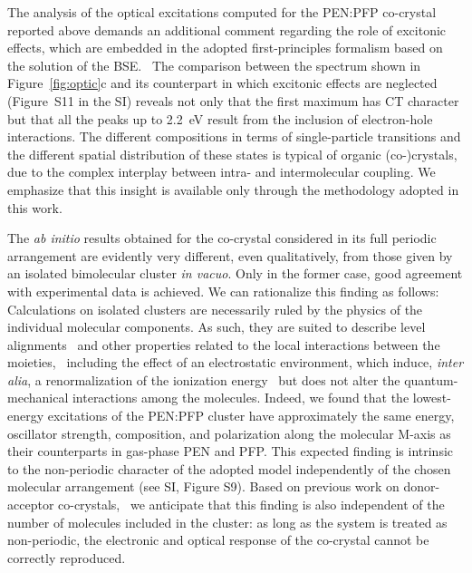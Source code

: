 \documentclass[journal=jpclcd,manuscript=letter]{achemso}
\begin{document}
The analysis of the optical excitations computed for the PEN:PFP co-crystal reported above demands an additional comment regarding the role of excitonic effects, which are embedded in the adopted first-principles formalism based on the solution of the BSE.~\cite{vorw+19es}
The comparison between the spectrum shown in Figure~\ref{fig:optic}c and its counterpart in which excitonic effects are neglected (Figure~S11 in the SI) reveals not only that the first maximum has CT character but that all the %
peaks up to 2.2~eV result from the inclusion of %
electron-hole interactions.
The different compositions in terms of single-particle transitions and the different spatial distribution of these %
states is typical of organic (co-)crystals, due to the complex interplay between intra- and intermolecular coupling.\cite{cocc+18pccp,guer+21jpcc} 
We emphasize that this insight is available only through 
the methodology adopted in this work.

The \textit{ab initio} results obtained
for the co-crystal considered in its full periodic arrangement are evidently very different, even qualitatively, from those given by an isolated bimolecular cluster \textit{in vacuo}. 
Only in the former case, good agreement with experimental data is achieved.
We can rationalize this finding as follows:
Calculations on isolated clusters are necessarily ruled by the physics of the individual molecular components.
As such, they are suited to describe level alignments~\cite{salz+12prl,theu+21jpcc,zeis+21jpcl} and other properties related to the local interactions between the moieties,~\cite{vale-cocc19jpcc,vale+20pccp} including the effect of an electrostatic environment, which induce, \textit{inter alia}, a renormalization of the ionization energy~\cite{orts+20afm,krum+21jcp} but does not alter the quantum-mechanical interactions among the molecules.
Indeed, we found that the lowest-energy excitations of the PEN:PFP cluster 
have approximately the same energy, oscillator strength, composition, and polarization along the molecular M-axis as their counterparts in gas-phase PEN and PFP. 
This expected finding is intrinsic to the non-periodic character of the adopted model independently of the chosen molecular arrangement (see SI, Figure S9).
Based on previous work on donor-acceptor co-crystals,~\cite{vale+20pccp} we anticipate that this finding is also independent of the number of molecules included in the cluster: as long as the system is treated as non-periodic, the electronic and optical response of the co-crystal cannot be correctly reproduced.
\end{document}
